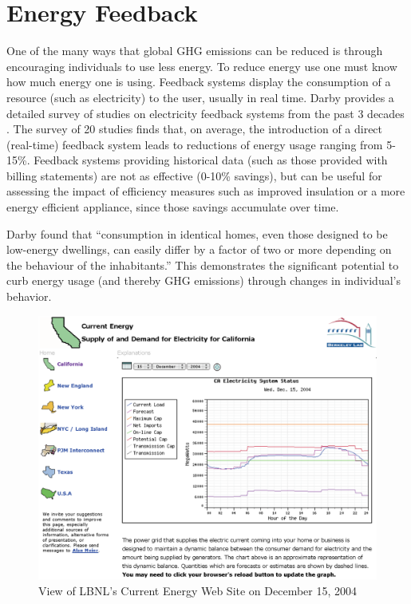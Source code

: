 \section{Energy Feedback}

One of the many ways that global GHG emissions can be reduced is through encouraging individuals to use less energy. To reduce energy use one must know how much energy one is using. Feedback systems display the consumption of a resource (such as electricity) to the user, usually in real time. Darby provides a detailed survey of studies on electricity feedback systems from the past 3 decades \cite{darby-review-2006}. The survey of 20 studies finds that, on average, the introduction of a direct (real-time) feedback system leads to reductions of energy usage ranging from 5-15\%. Feedback systems providing historical data (such as those provided with billing statements) are not as effective (0-10\% savings), but can be useful for assessing the impact of efficiency measures such as improved insulation or a more energy efficient appliance, since those savings accumulate over time.

Darby found that ``consumption in identical homes, even those designed to be low-energy dwellings, can easily differ by a factor of two or more depending on the behaviour of the inhabitants.'' This demonstrates the significant potential to curb energy usage (and thereby GHG emissions) through changes in individual's behavior.

\begin{figure}[htbp]
	\begin{center}
		\includegraphics[scale=0.59]{figures/final/current-energy-website}
		\caption{View of LBNL's Current Energy Web Site on December 15, 2004}
		\label{fig:current-energy-website}
 	\end{center}
\end{figure}

